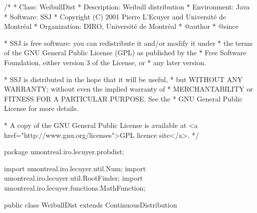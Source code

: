 \begin{code}\begin{hide}
/*
 * Class:        WeibullDist
 * Description:  Weibull distribution
 * Environment:  Java
 * Software:     SSJ 
 * Copyright (C) 2001  Pierre L'Ecuyer and Université de Montréal
 * Organization: DIRO, Université de Montréal
 * @author       
 * @since

 * SSJ is free software: you can redistribute it and/or modify it under
 * the terms of the GNU General Public License (GPL) as published by the
 * Free Software Foundation, either version 3 of the License, or
 * any later version.

 * SSJ is distributed in the hope that it will be useful,
 * but WITHOUT ANY WARRANTY; without even the implied warranty of
 * MERCHANTABILITY or FITNESS FOR A PARTICULAR PURPOSE.  See the
 * GNU General Public License for more details.

 * A copy of the GNU General Public License is available at
   <a href="http://www.gnu.org/licenses">GPL licence site</a>.
 */
\end{hide}
package umontreal.iro.lecuyer.probdist;
\begin{hide}
import umontreal.iro.lecuyer.util.Num;
import umontreal.iro.lecuyer.util.RootFinder;
import umontreal.iro.lecuyer.functions.MathFunction;
\end{hide}
public class WeibullDist extends ContinuousDistribution\begin{hide} {
   private double alpha;
   private double lambda;
   private double delta;

   private static class Function implements MathFunction {
      private int n;
      private double xi[];
      private double lnXi[];
      private double sumLnXi = 0.0;
      private final double LN_EPS = Num.LN_DBL_MIN - Num.LN2;

      public Function (double x[], int n)
      {
         this.n = n;
         this.xi = new double[n];
         this.lnXi = new double[n];

         for (int i = 0; i < n; i++)
         {
            this.xi[i] = x[i];
            if (x[i] > 0.0)
               this.lnXi[i] = Math.log (x[i]);
            else
               this.lnXi[i] = LN_EPS;
            sumLnXi += this.lnXi[i];
         }
      }

      public double evaluate (double x)
      {
         if (x <= 0.0) return 1.0e200;
         double sumXiLnXi = 0.0;
         double sumXi = 0.0;
         double xalpha;

         for (int i = 0; i < n; i++)
         {
            xalpha = Math.pow (this.xi[i], x);
            sumXiLnXi += xalpha * lnXi[i];
            sumXi += xalpha;
         }

         return (x * (n * sumXiLnXi - sumLnXi * sumXi) - n * sumXi);
      }
   }

\end{hide}
\end{code}
